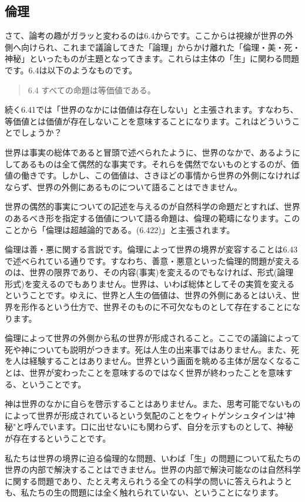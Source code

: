 \documentclass[11pt,a4paper]{jsbook}
\begin{document}
\subsection{倫理}
さて、論考の趣がガラッと変わるのは6.4からです。ここからは視線が世界の外側へ向けられ、これまで議論してきた「論理」からかけ離れた「倫理・美・死・神秘」といったものが主題となってきます。これらは主体の「生」に関わる問題です。6.4は以下のようなものです。
\begin{quote}
6.4 すべての命題は等価値である。
\end{quote}
続く6.41では「世界のなかには価値は存在しない」と主張されます。すなわち、等価値とは価値が存在しないことを意味することになります。これはどういうことでしょうか？
\par
世界は事実の総体であると冒頭で述べられたように、世界のなかで、あるようにしてあるものは全て偶然的な事実です。それらを偶然でないものとするのが、価値の働きです。しかし、この価値は、さきほどの事情から世界の外側になければならず、世界の外側にあるものについて語ることはできません。\par
世界の偶然的事実についての記述を与えるのが自然科学の命題だとすれば、世界のあるべき形を指定する価値について語る命題は、倫理の範疇になります。このことから「倫理は超越論的である。(6.422)」と主張されます。\par
倫理は善・悪に関する言説です。倫理によって世界の境界が変容することは6.43で述べられている通りです。すなわち、善意・悪意といった倫理的問題が変えるのは、世界の限界であり、その内容(事実)を変えるのでもなければ、形式(論理形式)を変えるのでもありません。世界は、いわば総体としてその実質を変えるということです。ゆえに、世界と人生の価値は、世界の外側にあるとはいえ、世界を形作るという仕方で、世界そのものに不可欠なものとして存在することになります。
\par
倫理によって世界の外側から私の世界が形成されること。ここでの議論によって死や神についても説明がつきます。死は人生の出来事ではありません。また、死を人は経験することはありません。世界という画面を眺める主体が居なくなることは、世界が変わったことを意味するのではなく世界が終わったことを意味する、ということです。
\par
神は世界のなかに自らを啓示することはありません。また、思考可能でないものによって世界が形成されているという気配のことをウィトゲンシュタインは"神秘"と呼んでいます。口に出せないにも関わらず、自分を示すものとして、神秘が存在するということです。
\par
私たちは世界の境界に迫る倫理的な問題、いわば「生」の問題について私たちの世界の内部で解決することはできません。世界の内部で解決可能なのは自然科学に関する問題であり、たとえ考えられうる全ての科学の問いに答えられようとも、私たちの生の問題には全く触れられていない、ということになります。
\end{document}
